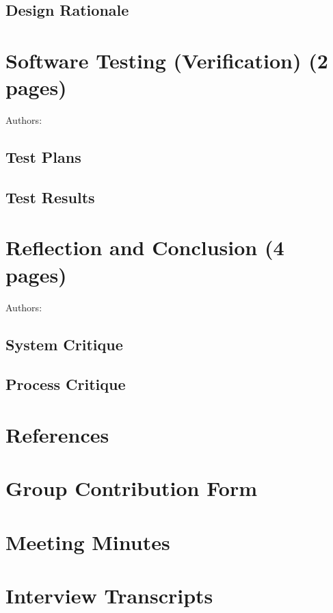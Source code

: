 \documentclass[12pt,a4paper]{article}
\begin{document}
\subsection{Design Rationale}


\section{Software Testing (Verification) (2 pages)}
Authors:
\label{sec:testing}
\subsection{Test Plans}

\subsection{Test Results}


\section{Reflection and Conclusion (4 pages)}
Authors:
\label{sec:reflection}
\subsection{System Critique}

\subsection{Process Critique}


\newpage

\section*{References}
% 

\newpage
\appendix

\section{Group Contribution Form}

\section{Meeting Minutes}

\section{Interview Transcripts}
\end{document}
